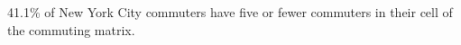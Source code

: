41.1\% of New York City commuters have five or fewer commuters in their cell of the commuting matrix.
